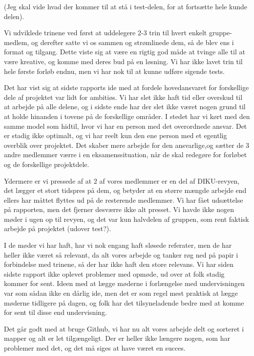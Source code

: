 \documentclass[10pt,a4paper,danish]{article}
\begin{document}
(Jeg skal vide hvad der kommer til at stå i test-delen, for at fortsætte hele kunde delen).

Vi udviklede trinene ved først at uddelegere 2-3 trin til hvert enkelt gruppe-
medlem, og derefter satte vi os sammen og strømlinede dem, så de blev ens i
format og tilgang. Dette viste sig at være en rigtig god måde at tvinge alle
til at være kreative, og komme med deres bud på en løsning. Vi har ikke lavet
trin til hele første forløb endnu, men vi har nok til at kunne udføre sigende
tests.

Det har vist sig at sidste rapports ide med at fordele hovedansvaret for
forskellige dele af projektet var lidt for ambitiøs. Vi har slet ikke haft tid
eller overskud til at arbejde på alle delene, og i sidste ende har der slet
ikke været nogen grund til at holde hinanden i tovene på de forskellige områder.
I stedet har vi kørt med den samme model som hidtil, hvor vi har en person med
det overordnede ansvar. Det er stadig ikke optimalt, og vi har reelt kun den ene
person med et egentlig overblik over projektet. Det skaber mere arbejde for den
ansvarlige,og sætter de 3 andre medlemmer værre i en eksamenssituation, når de
skal redegøre for forløbet og de forskellige projektdele.

Ydermere er vi pressede af at 2 af vores medlemmer er en del af DIKU-revyen,
det lægger et stort tidspres på dem, og betyder at en større mængde arbejde
end ellers har måttet flyttes ud på de resterende medlemmer. Vi har fået
udsættelse på rapporten, men det fjerner desværre ikke alt presset. Vi havde
ikke nogen møder i ugen op til revyen, og det var kun halvdelen af gruppen,
som rent faktisk arbejde på projektet (udover test?).

I de møder vi har haft, har vi nok engang haft sløsede referater, men de har
heller ikke været så relevant, da alt vores arbejde og tanker røg ned på papir
i forbindelse med trinene, så der har ikke haft den store relevans. Vi har
siden sidste rapport ikke oplevet problemer med opmøde, ud over at folk stadig
kommer for sent. Ideen med at lægge møderne i forlængelse med undervisningen
var som sådan ikke en dårlig ide, men det er som regel mest praktisk at lægge
møderne tidligere på dagen, og folk har det tilsyneladende bedre med at komme
for sent til disse end undervisning. 

Det går godt med at bruge Github, vi har nu alt vores arbejde delt og sorteret
i mapper og alt er let tilgængeligt. Der er heller ikke længere nogen, som
har problemer med det, og det må siges at have været en succes.
\end{document}
